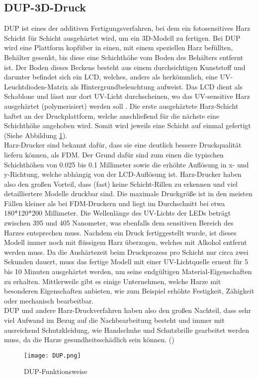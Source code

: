 \subsection{DUP-3D-Druck}
\label{subsec:tDUP}
\ac{DUP} ist eines der additiven Fertigungsverfahren, bei dem ein fotosensitives Harz Schicht für Schicht ausgehärtet wird, um ein \ac{3D}-Modell zu fertigen. Bei \ac{DUP} wird eine Plattform kopfüber in einen, mit einem speziellen Harz befüllten, Behälter gesenkt, bis diese eine Schichthöhe vom Boden des Behälters entfernt ist. Der Boden dieses Beckens besteht aus einem durchsichtigen Kunststoff und darunter befindet sich ein \ac{LCD}, welches, anders als herkömmlich, eine \ac{UV}-Leuchtdioden-Matrix als Hintergrundbeleuchtung aufweist. Das \ac{LCD} dient als Schablone und lässt nur dort \ac{UV}-Licht durchscheinen, wo das \ac{UV}-sensitive Harz ausgehärtet (polymerisiert) werden soll . Die erste ausgehärtete Harz-Schicht haftet an der Druckplattform, welche anschließend für die nächste eine Schichthöhe angehoben wird. Somit wird jeweils eine Schicht auf einmal gefertigt (Siehe Abbildung \ref{fig:DUP}).\\ Harz-Drucker sind bekannt dafür, dass sie eine deutlich bessere Druckqualität liefern können, als \ac{FDM}. Der Grund dafür sind zum einen die typischen Schichthöhen von 0.025 bis 0.1 Millimeter sowie die erhöhte Auflösung in x- und y-Richtung, welche abhängig von der \ac{LCD}-Auflösung ist.  Harz-Drucker haben also den großen Vorteil, dass (fast) keine Schicht-Rillen zu erkennen und viel detailliertere Modelle druckbar sind. Die maximale Druckgröße ist in den meisten Fällen kleiner als bei \ac{FDM}-Druckern und liegt im Durchschnitt bei etwa 180*120*200 Millimeter. Die Wellenlänge des \ac{UV}-Lichts der LEDs beträgt zwischen 395 und 405 Nanometer, was ebenfalls dem sensitiven Bereich des Harzes entsprechen muss. Nachdem ein Druck fertiggestellt wurde, ist dieses Modell immer noch mit flüssigem Harz überzogen, welches mit Alkohol entfernt werden muss. Da die Aushärtezeit beim Druckprozess pro Schicht nur circa zwei Sekunden dauert, muss das fertige Modell mit einer \ac{UV}-Lichtquelle erneut für 5 bis 10 Minuten ausgehärtet werden, um seine endgültigen Material-Eigenschaften zu erhalten. Mittlerweile gibt es einige Unternehmen, welche Harze mit besonderen Eigenschaften anbieten, wie zum Beispiel erhöhte Festigkeit, Zähigkeit oder mechanisch bearbeitbar.\\
\ac{DUP} und andere Harz-Druckverfahren haben also den großen Nachteil, dass sehr viel Aufwand im Bezug auf die Nachbearbeitung besteht und immer mit ausreichend Schutzkleidung, wie Handschuhe und Schutzbrille gearbeitet werden muss, da die Harze gesundheitsschädlich sein können. (\cite{druckwegeDUP})
\begin{figure}[h]
\centering
\texttt{[image: DUP.png]}
\caption{DUP-Funktionsweise}
\label{fig:DUP}
\end{figure}